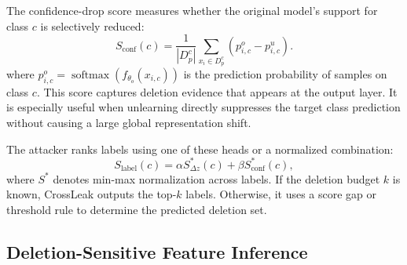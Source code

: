 The confidence-drop score measures whether the original model's support for class $c$ is selectively reduced:
\begin{equation}
    S_{\mathrm{conf}}(c)=
    \frac{1}{|D_p^c|}\sum_{x_i\in D_p^c}
    \left(p_{i,c}^{o}-p_{i,c}^{u}\right).
    \label{eq:confidence_drop_score}
\end{equation}
where $p_{i,c}^{o} = \operatorname{softmax}(f_{\theta_o}(x_{i,c}))$ is the prediction probability of samples on class $c$. This score captures deletion evidence that appears at the output layer. It is especially useful when unlearning directly suppresses the target class prediction without causing a large global representation shift.

 
The attacker ranks labels using one of these heads or a normalized combination:
\begin{equation}
    S_{\mathrm{label}}(c)=
    \alpha S_{\Delta z}^{*}(c)
    + \beta S_{\mathrm{conf}}^{*}(c),
    \label{eq:label_score}
\end{equation}
where $S^{*}$ denotes min-max normalization across labels. If the deletion budget $k$ is known, CrossLeak outputs the top-$k$ labels. Otherwise, it uses a score gap or threshold rule to determine the predicted deletion set.

\subsection{Deletion-Sensitive Feature Inference}
\label{sec:approach_feature_inference}

